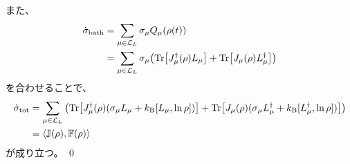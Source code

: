 \documentclass[a4paper,11pt]{jsarticle}
\numberwithin{equation}{section}
\begin{document}
また、
\begin{align}
    \dot{\sigma}_{\text{bath}} &= \sum_{\mu \in \mathcal{L}_{L}} \sigma_{\mu} Q_{\mu}(\rho(t)) \\
    &= \sum_{\mu \in \mathcal{L}_{L}} \sigma_{\mu} \qty( \Tr[ J_{\mu}^{\dagger}(\rho) L_{\mu} ] + \Tr[ J_{\mu}(\rho) L_{\mu}^{\dagger} ]) 
\end{align}
を合わせることで、
\begin{align}
    \dot{\sigma}_{\text{tot}} &= \sum_{\mu \in \mathcal{L}_{L}} \qty( \Tr[ J_{\mu}^{\dagger}(\rho) (\sigma_{\mu} L_{\mu} + k_{\text{B}} [L_{\mu}, \ln \rho] ) ] + \Tr[ J_{\mu}(\rho) (\sigma_{\mu} L_{\mu}^{\dagger} + k_{\text{B}} [L_{\mu}^{\dagger}, \ln \rho] ) ]) \\
    &= \ev{ \mathbb{J}(\rho) , \mathbb{F}(\rho) }
\end{align}
が成り立つ。
\qed\\
\end{document}
